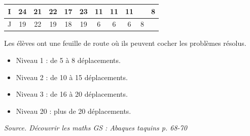 \begin{exercice*}
\begin{minipage}{10cm}
\begin{tabular}{|*{11}{c|}}
      \hline
      I & 24 & 21 & 22 & 17 & 23 & 11 & 11 & 11 & & 8 \\
      \hline
      J & 19 & 22 & 19 & 18 & 19 & 6 & 6 & 6 & 8 & \\
      \hline
   \end{tabular}
\end{minipage}
\begin{minipage}{6cm}
   Les élèves ont une feuille de route où ils peuvent cocher les problèmes résolus.
   \begin{itemize}
      \item Niveau 1 : de 5 à 8 déplacements.
      \item Niveau 2 : de 10 à 15 déplacements.
      \item Niveau 3 : de 16 à 20 déplacements.
      \item Niveau 20 : plus de 20 déplacements. \\
   \end{itemize}
   \vfill\hfill{\it\small Source. Découvrir les maths GS : Abaques taquins p. 68-70}
\end{minipage}
\end{exercice*}


